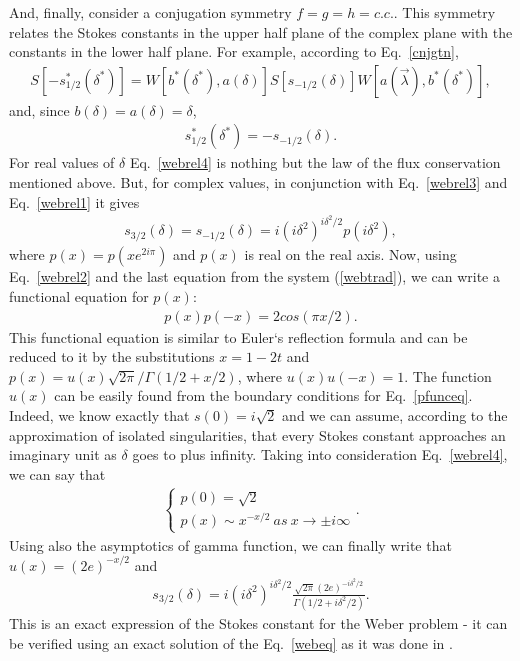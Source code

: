 \documentclass[aps,prl,preprint,superscriptaddress]{revtex4}
\begin{document}
And, finally, consider a conjugation symmetry $f=g=h=c.c.$. This symmetry relates the Stokes constants in the upper half plane of the complex plane with the constants in the lower half plane. For example, according to Eq.~\ref{cnjgtn},
\begin{eqnarray}
S[-s_{1/2}^*(\delta^*)] = W[b^*(\delta^*),a(\delta)]S[s_{-1/2}(\delta)]W[a(\vec{\lambda}),b^*(\delta^*)],
\label{webcs1}
\end{eqnarray}
and, since $b(\delta)=a(\delta)=\delta$,
\begin{eqnarray}
s_{1/2}^*(\delta^*)=-s_{-1/2}(\delta).
\label{webrel4}
\end{eqnarray}
For real values of $\delta$ Eq.~\ref{webrel4} is nothing but the law of the flux conservation mentioned above. But, for complex values, in conjunction with Eq.~\ref{webrel3} and Eq.~\ref{webrel1} it gives
\begin{eqnarray}
s_{3/2}(\delta)=s_{-1/2}(\delta)=i(i\delta^2)^{i\delta^2/2}p(i\delta^2),
\label{webrel4}
\end{eqnarray}
where $p(x)=p(x e^{2i\pi})$ and $p(x)$ is real on the real axis. Now, using Eq.~\ref{webrel2} and the last equation from the 
system (\ref{webtrad}), we can write a functional equation for $p(x)$:
\begin{eqnarray}
p(x)p(-x)=2cos(\pi x/2).
\label{pfunceq}
\end{eqnarray}
This functional equation is similar to Euler`s reflection formula and can be reduced to it by the substitutions
$x=1-2t$ and $p(x)=u(x)\sqrt{2\pi}/\Gamma(1/2+x/2)$, where $u(x)u(-x)=1$. The function $u(x)$ can be easily found from the boundary conditions for Eq.~\ref{pfunceq}. Indeed, we know exactly \cite{white} that $s(0)=i\sqrt{2}$ and we can assume, according to the approximation of isolated singularities, that every Stokes constant approaches an imaginary unit as $\delta$ goes to plus infinity. Taking into consideration Eq.~\ref{webrel4}, we can say that
\begin{eqnarray}
\begin{cases} 
p(0) = \sqrt{2}\\
p(x) \sim x^{-x/2}\ as\ x \rightarrow \pm i \infty 
\end{cases}.
\label{pbnds}  
\end{eqnarray}
Using also the asymptotics of gamma function, we can finally write that $u(x)=(2e)^{-x/2}$ and
\begin{eqnarray}
s_{3/2}(\delta)=i(i\delta^2)^{i\delta^2/2}\frac{\sqrt{2\pi}(2e)^{-i\delta^2/2}}{\Gamma(1/2+i\delta^2/2)}.
\label{webfinal}  
\end{eqnarray}
This is an exact expression of the Stokes constant for the Weber problem - it can be verified using an exact solution 
of the Eq.~\ref{webeq} as it was done in \cite{ours}.
    
\end{document}
